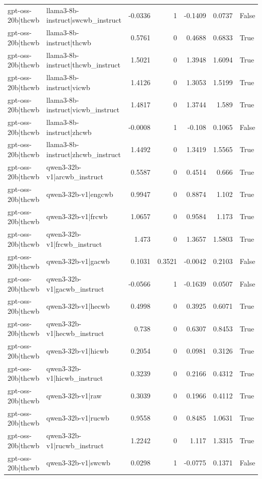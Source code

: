 \begin{table}
\begin{tabular}{l l r r r r l}
gpt-oss-20b|thcwb & llama3-8b-instruct|swcwb_instruct & -0.0336 & 1 & -0.1409 & 0.0737 & False \\
gpt-oss-20b|thcwb & llama3-8b-instruct|thcwb & 0.5761 & 0 & 0.4688 & 0.6833 & True \\
gpt-oss-20b|thcwb & llama3-8b-instruct|thcwb_instruct & 1.5021 & 0 & 1.3948 & 1.6094 & True \\
gpt-oss-20b|thcwb & llama3-8b-instruct|vicwb & 1.4126 & 0 & 1.3053 & 1.5199 & True \\
gpt-oss-20b|thcwb & llama3-8b-instruct|vicwb_instruct & 1.4817 & 0 & 1.3744 & 1.589 & True \\
gpt-oss-20b|thcwb & llama3-8b-instruct|zhcwb & -0.0008 & 1 & -0.108 & 0.1065 & False \\
gpt-oss-20b|thcwb & llama3-8b-instruct|zhcwb_instruct & 1.4492 & 0 & 1.3419 & 1.5565 & True \\
gpt-oss-20b|thcwb & qwen3-32b-v1|arcwb_instruct & 0.5587 & 0 & 0.4514 & 0.666 & True \\
gpt-oss-20b|thcwb & qwen3-32b-v1|engcwb & 0.9947 & 0 & 0.8874 & 1.102 & True \\
gpt-oss-20b|thcwb & qwen3-32b-v1|frcwb & 1.0657 & 0 & 0.9584 & 1.173 & True \\
gpt-oss-20b|thcwb & qwen3-32b-v1|frcwb_instruct & 1.473 & 0 & 1.3657 & 1.5803 & True \\
gpt-oss-20b|thcwb & qwen3-32b-v1|gacwb & 0.1031 & 0.3521 & -0.0042 & 0.2103 & False \\
gpt-oss-20b|thcwb & qwen3-32b-v1|gacwb_instruct & -0.0566 & 1 & -0.1639 & 0.0507 & False \\
gpt-oss-20b|thcwb & qwen3-32b-v1|hecwb & 0.4998 & 0 & 0.3925 & 0.6071 & True \\
gpt-oss-20b|thcwb & qwen3-32b-v1|hecwb_instruct & 0.738 & 0 & 0.6307 & 0.8453 & True \\
gpt-oss-20b|thcwb & qwen3-32b-v1|hicwb & 0.2054 & 0 & 0.0981 & 0.3126 & True \\
gpt-oss-20b|thcwb & qwen3-32b-v1|hicwb_instruct & 0.3239 & 0 & 0.2166 & 0.4312 & True \\
gpt-oss-20b|thcwb & qwen3-32b-v1|raw & 0.3039 & 0 & 0.1966 & 0.4112 & True \\
gpt-oss-20b|thcwb & qwen3-32b-v1|rucwb & 0.9558 & 0 & 0.8485 & 1.0631 & True \\
gpt-oss-20b|thcwb & qwen3-32b-v1|rucwb_instruct & 1.2242 & 0 & 1.117 & 1.3315 & True \\
gpt-oss-20b|thcwb & qwen3-32b-v1|swcwb & 0.0298 & 1 & -0.0775 & 0.1371 & False \\

\end{tabular}
\end{table}
